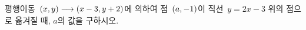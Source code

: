 평행이동~$(x{,}\mkern3mu\mathopen{}y)\longrightarrow(x-3{,}\mkern3mu\mathopen{}y+2)$에 의하여 점~$(a{,}\mkern3mu\mathopen{}-1)$이 직선~$y=2x-3$ 위의 점으로 옮겨질 때, $a$의 값을 구하시오.
